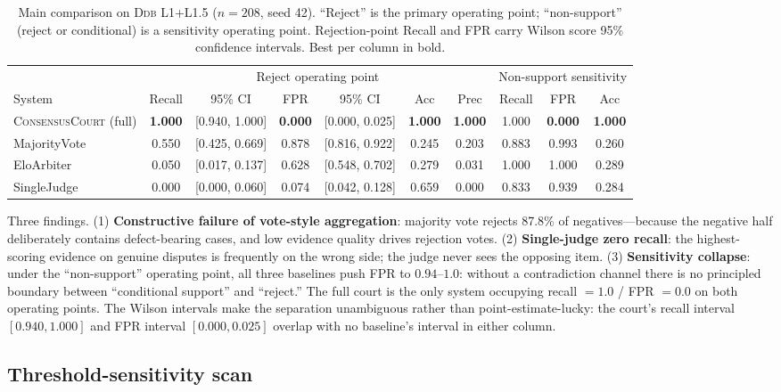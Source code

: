 \documentclass[11pt]{article}
\newcommand{\court}{\textsc{ConsensusCourt}}
\newcommand{\ddb}{\textsc{Ddb}}
\begin{document}
\begin{table}[t]
\centering\small
\caption{Main comparison on \ddb{} L1+L1.5 ($n=208$, seed 42). ``Reject''
is the primary operating point; ``non-support'' (reject or conditional) is a
sensitivity operating point. Rejection-point Recall and FPR carry Wilson
score 95\% confidence intervals. Best per column in bold.}
\label{tab:main}
\setlength{\tabcolsep}{2.4pt}%
\begin{tabular}{@{}lcccccc|ccc@{}}
\toprule
& \multicolumn{6}{c|}{Reject operating point} &
\multicolumn{3}{c}{Non-support sensitivity} \\
System & Recall & 95\% CI & FPR & 95\% CI & Acc & Prec & Recall & FPR & Acc \\
\midrule
\court{} (full) & \textbf{1.000} & [0.940, 1.000] & \textbf{0.000} & [0.000, 0.025] & \textbf{1.000} & \textbf{1.000} & 1.000 & \textbf{0.000} & \textbf{1.000} \\
MajorityVote & 0.550 & [0.425, 0.669] & 0.878 & [0.816, 0.922] & 0.245 & 0.203 & 0.883 & 0.993 & 0.260 \\
EloArbiter & 0.050 & [0.017, 0.137] & 0.628 & [0.548, 0.702] & 0.279 & 0.031 & 1.000 & 1.000 & 0.289 \\
SingleJudge & 0.000 & [0.000, 0.060] & 0.074 & [0.042, 0.128] & 0.659 & 0.000 & 0.833 & 0.939 & 0.284 \\
\bottomrule
\end{tabular}
\end{table}

Three findings. (1) \textbf{Constructive failure of vote-style
aggregation}: majority vote rejects 87.8\% of negatives—because the
negative half deliberately contains defect-bearing cases, and low evidence
quality drives rejection votes. (2) \textbf{Single-judge zero recall}: the
highest-scoring evidence on genuine disputes is frequently on the wrong
side; the judge never sees the opposing item. (3) \textbf{Sensitivity
collapse}: under the ``non-support'' operating point, all three baselines
push FPR to $0.94$--$1.0$: without a contradiction channel there is no
principled boundary between ``conditional support'' and ``reject.''
The full court is the only system occupying recall $=1.0$ / FPR $=0.0$ on
both operating points. The Wilson intervals make the separation
unambiguous rather than point-estimate-lucky: the court's recall interval
$[0.940, 1.000]$ and FPR interval $[0.000, 0.025]$ overlap with no
baseline's interval in either column.

\subsection{Threshold-sensitivity scan}\label{sec:sensitivity}
\end{document}
